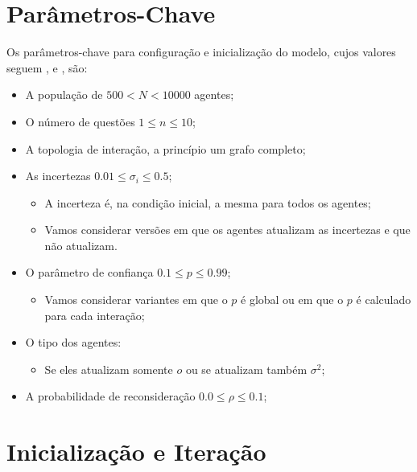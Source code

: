 \section{Parâmetros-Chave}

Os parâmetros-chave para configuração e inicialização do modelo, cujos valores
seguem ,  e
, são:
\begin{itemize}
\item A população de \(500 < N < 10000\) agentes;
\item O número de questões \(1 \leq n \leq 10\); 

\item A topologia de interação, a princípio um grafo completo;  

\item As incertezas \(0.01 \leq \sigma_i \leq 0.5\);
  \begin{itemize}
  \item A incerteza é, na condição inicial, a mesma para todos os agentes;
  \item Vamos considerar versões em que os agentes atualizam as incertezas e que
    não atualizam.
  \end{itemize}

\item O parâmetro de confiança \(0.1 \leq p \leq 0.99\);
  
  \begin{itemize}
  \item Vamos considerar variantes em que o \(p\) é global ou em que o \(p\) é
    calculado para cada interação;
  \end{itemize}


\item O tipo dos agentes:
  \begin{itemize}
  \item Se eles atualizam somente \(o\) ou se atualizam também \(\sigma^2\);
  \end{itemize}


\item A probabilidade de reconsideração \(0.0 \leq \rho  \leq 0.1\);

\end{itemize}

\section{Inicialização e Iteração}

